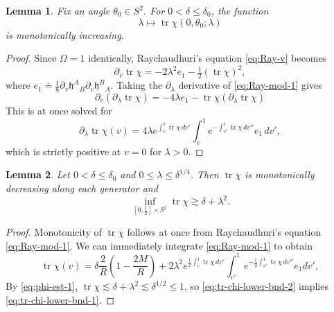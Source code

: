 \documentclass[10pt]{article}
\numberwithin{equation}{section}
\theoremstyle{plain}
\newtheorem{lem}{Lemma}[section]
\theoremstyle{definition}
\newcommand{\les}{\lesssim}
\newcommand{\tr}{\operatorname{tr}}
\begin{document}
\begin{lem} Fix an angle $\theta_0\in S^2$. 
For $0< \delta \leq \delta_0$, the function 
\begin{equation}\nonumber
\lambda\longmapsto \tr \chi(0,\theta_0;\lambda)
\end{equation}
is monotonically increasing. 
\end{lem}
\begin{proof}
Since $\Omega=1$ identically, Raychaudhuri's equation \eqref{eq:Ray-v} becomes
\begin{equation}
\partial_v \tr\chi = -2\lambda^2e_1 - \tfrac 12 (\tr\chi)^2,\label{eq:Ray-mod-1}
\end{equation}
where $e_1\doteq \tfrac 18 \partial_v \mathfrak h^A{}_B \partial_v\mathfrak h^B{}_A$. 
Taking the $\partial_\lambda$ derivative of \eqref{eq:Ray-mod-1} gives
\begin{equation}
\partial_v\left(\partial_\lambda \tr\chi \right) = -4\lambda e_1 - \tr\chi(\partial_\lambda\tr\chi)\nonumber
\end{equation}
This is at once solved for 
\begin{equation}\nonumber
\partial_\lambda \tr\chi(v) = 4\lambda  e^{\int_v^1 \tr\chi\,dv'}\int_v^1 e^{-\int_{v'}^1\tr\chi\,dv''}e_1\,dv',
\end{equation}
which is strictly positive at $v=0$ for $\lambda>0$.
\end{proof}

\begin{lem}
   Let $0< \delta \leq \delta_0$ and  $0\le \lambda\le \delta^{1/4}$. Then $\tr\chi$ is monotonically decreasing along each generator and
    \begin{equation}
      \inf_{[0,\tfrac 12]\times S^2}  \tr\chi \gtrsim \delta +\lambda^2.\label{eq:tr-chi-lower-bnd-1}
    \end{equation}
\end{lem}
\begin{proof} Monotonicity of $\tr\chi$ follows at once from Raychaudhuri's equation \eqref{eq:Ray-mod-1}. 
    We can immediately integrate \eqref{eq:Ray-mod-1} to obtain 
    \begin{equation}
        \tr\chi(v)=\delta\frac{2}{R}\left(1-\frac{2M}{R}\right) +2 \lambda^2 e^{\tfrac 12\int_v^1\tr\chi \,dv'}\int_{v'}^1e^{-\tfrac 12\int_{v'}^1\tr\chi\,dv''}e_1dv', \label{eq:tr-chi-lower-bnd-2}
    \end{equation}
    By \eqref{eq:phi-est-1}, $\tr\chi \les \delta+\lambda^2\les \delta^{1/2}\le 1$, so \eqref{eq:tr-chi-lower-bnd-2} implies \eqref{eq:tr-chi-lower-bnd-1}.
\end{proof}
\end{document}
